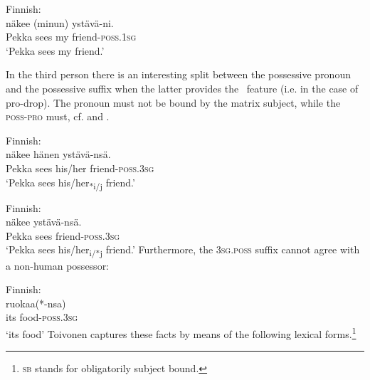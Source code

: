 \documentclass[output=paper,hidelinks]{langscibook}
\begin{document}
\ea%
    \label{ex:FinnoUgric:88}Finnish:\\
     näkee (minun) ystävä-ni.\\
        Pekka sees my friend-\textsc{poss.1sg}\\
    \glt `Pekka sees my friend.'
    \z

\ea%
    \label{ex:FinnoUgric:89}
         {}
    \z

\ea%
    \label{ex:FinnoUgric:90}
         {}
    \z
In the third person there is an interesting split between the possessive pronoun and the possessive suffix when the latter provides the \PRED\ feature (i.e. in the case of pro-drop). The pronoun must not be bound by the matrix subject, while the \textsc{poss}{}-\textsc{pro} must, cf.  and .

\ea%
    \label{ex:FinnoUgric:91}Finnish:\\
     näkee hänen ystävä-nsä.\\
        Pekka sees his/her friend-\textsc{poss.3sg}\\
    \glt `Pekka sees his/her\textsubscript{*i/j} friend.'
    \z

          
\ea%
    \label{ex:FinnoUgric:92}Finnish:\\
     näkee ystävä-nsä.\\
        Pekka sees friend-\textsc{poss.3sg}\\
    \glt `Pekka sees his/her\textsubscript{i/*j} friend.'
    \z
Furthermore, the \textsc{3sg.poss} suffix cannot agree with a non-human possessor:

\ea%
    \label{ex:FinnoUgric:93}Finnish:\\
     {ruokaa(*-nsa)}\\
        its food-\textsc{poss.3sg}\\
    \glt`its food'
    \z
Toivonen captures these facts by means of the following lexical forms.\footnote{\textsc{sb} stands for obligatorily subject bound.}

\ea%
    \label{ex:FinnoUgric:94}
     
\z
\end{document}
